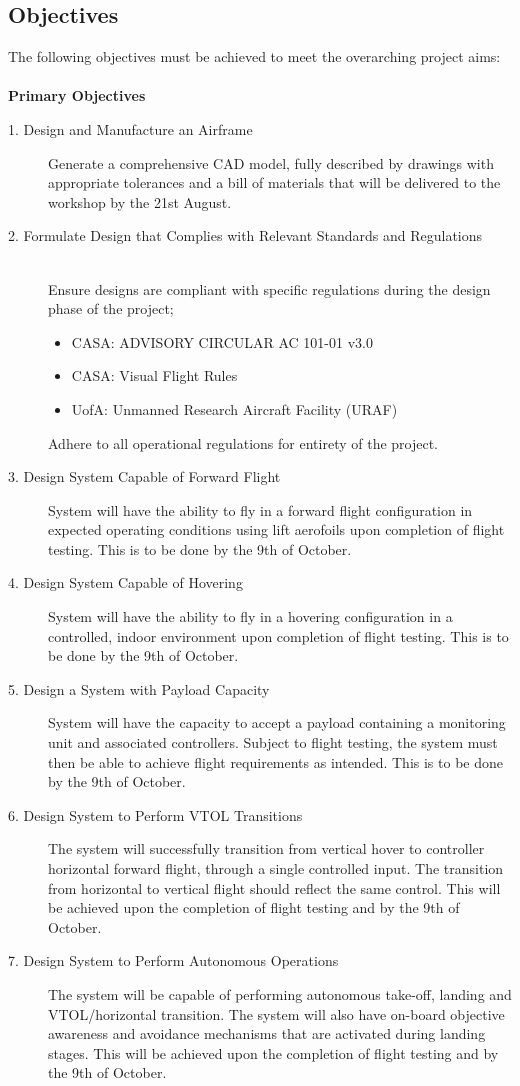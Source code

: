 
\subsection{Objectives}
The following objectives must be achieved to meet the overarching project aims:\\
\\
\textbf{Primary Objectives}
\begin{description}
    \item[1. Design and Manufacture an Airframe]
     Generate a comprehensive CAD model, fully described by drawings with appropriate tolerances and a bill of materials that will be delivered to the workshop by the 21st August. %
    \item[2. Formulate Design that Complies with Relevant Standards and Regulations]\\
    Ensure designs are compliant with specific regulations during the design phase of the project;
    \begin{itemize}
        \item CASA: ADVISORY CIRCULAR AC 101-01 v3.0
        \item CASA: Visual Flight Rules
        \item UofA: Unmanned Research Aircraft Facility (URAF)
    \end{itemize}
    Adhere to all operational regulations for entirety of the project.
    \item[3. Design System Capable of Forward Flight]
    System will have the ability to fly in a forward flight configuration in expected operating conditions using lift aerofoils upon completion of flight testing. This is to be done by the 9th of October.
    \item[4. Design System Capable of Hovering]
    System will have the ability to fly in a hovering configuration in a controlled, indoor environment upon completion of flight testing. This is to be done by the 9th of October. 
    \item[5. Design a System with Payload Capacity]
    System will have the capacity to accept a payload containing a monitoring unit and associated controllers. Subject to flight testing, the system must then be able to achieve flight requirements as intended. This is to be done by the 9th of October. 
    \item[6. Design System to Perform VTOL Transitions]
    The system will successfully transition from vertical hover to controller horizontal forward flight, through a single controlled input. The transition from horizontal to vertical flight should reflect the same control. This will be achieved upon the completion of flight testing and by the 9th of October. 
    \item[7. Design System to Perform Autonomous Operations]
    The system will be capable of performing autonomous take-off, landing and VTOL/horizontal transition. The system will also have on-board objective awareness and avoidance mechanisms that are activated during landing stages. This will be achieved upon the completion of flight testing and by the 9th of October.
    \end{description}
